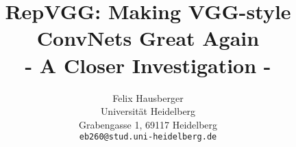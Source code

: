 \documentclass[final]{cvpr}
\begin{document}
\title{RepVGG: Making VGG-style ConvNets Great Again \\ - A Closer Investigation -}

\author{Felix Hausberger\\
	Universität Heidelberg\\
	Grabengasse 1, 69117 Heidelberg\\
	{\tt\small eb260@stud.uni-heidelberg.de}
}

\maketitle






















{\small


}
\end{document}
